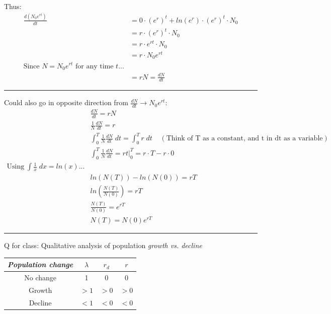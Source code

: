 \documentclass{article}
\newcommand*\circled[1]{\tikz[baseline=(char.base)]{
            \node[shape=circle,draw,inner sep=2pt] (char) {#1};}}
\begin{document}
Thus:
\begin{align*}
	\frac{d(N_0 e ^{rt})}{dt} & =0 \cdot (e^r)^t + ln(e^r)\cdot (e^r)^t \cdot N_0\\
	&= r \cdot (e^r)^t \cdot N_0\\
	&= r \cdot e^{rt} \cdot N_0 \\
	&= r \cdot N_0 e^{rt} \\
\text{Since } N=N_0 e^{rt} \text{ for any time } t ...&\\
	&=rN=\frac{dN}{dt}
\end{align*}

\rule[0.5ex]{\linewidth}{1pt}

\circled{4}
Could also go in opposite direction from $\frac{dN}{dt} \rightarrow N_0 e^{rt}$:
\begin{align*}
&	\frac{dN}{dt}=rN\\
&	\frac{1}{N}\frac{dN}{dt}=r\\
&	\int_0^T \frac{1}{N}\frac{dN}{dt} \; dt = \int_0^T r\; dt \;\;\;\;(\text{Think of T as a constant, and t in dt as a variable})\\
&	\int_0^T \frac{1}{N}\frac{dN}{dt}  = r t \vert_0^T = r \cdot T - r \cdot 0\\
	\text{Using} \; \int \frac{1}{x}\; dx = ln(x)...\\
&	ln(N(T))-ln(N(0))=rT\\
& ln\left( \frac{N(T)}{N(0)}\right) = rT\\
& \frac{N(T)}{N(0)}= e^{rT}\\
& N(T)=N(0)e^{rT}
\end{align*}

\rule[0.5ex]{\linewidth}{1pt}

\break

Q for class: Qualitative analysis of population \emph{growth vs. decline}

\begin{center}
\begin{tabular}{|c|c|c|c|}
\hline \rule[-2ex]{0pt}{5.5ex} \emph{Population change} & $\lambda$ & $r_d$ &  $r$ \\ 
\hline \rule[-2ex]{0pt}{5.5ex} No change & 1 & 0 & 0 \\ 
\hline \rule[-2ex]{0pt}{5.5ex} Growth  & $>1$ & $>0$ & $>0$ \\ 
\hline \rule[-2ex]{0pt}{5.5ex} Decline & $<1$ & $<0$ & $<0$ \\ 
\hline 
\end{tabular}
\end{center} 
\end{document}

